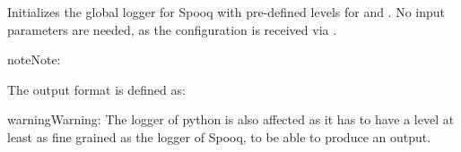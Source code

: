 \documentclass[a4paper,10pt, twoside,english]{sphinxmanual}
\begin{document}
\begin{fulllineitems}
\label{\detokenize{base_classes/spooq2_logger:spooq2.spooq2_logger.initialize}}
Initializes the global logger for Spooq with pre-defined levels for  and .
No input parameters are needed, as the configuration is received via {\hyperref[\detokenize{base_classes/spooq2_logger:spooq2.spooq2_logger.get_logging_level}]{}}.

\begin{sphinxadmonition}{note}{Note:}\begin{description}
\item[{The output format is defined as:}] \leavevmode
{}

\end{description}
\end{sphinxadmonition}

\begin{sphinxadmonition}{warning}{Warning:}
The  logger of python is also affected as it has to have a level at least as
fine grained as the logger of Spooq, to be able to produce an output.
\end{sphinxadmonition}

\end{fulllineitems}

\end{document}
